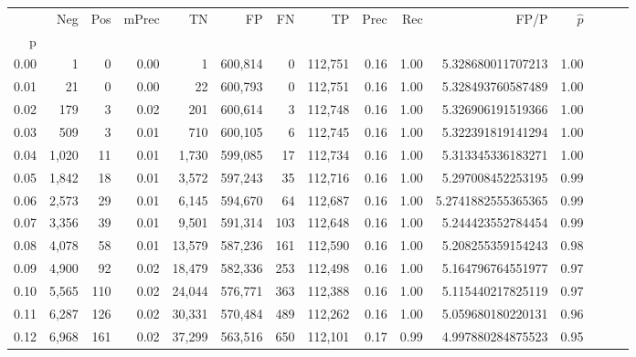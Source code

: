 \begin{tabular}{rrrrrrrrrrrrrrr}
\toprule
{} &     Neg &    Pos & mPrec &       TN &       FP &       FN &       TP &  Prec &   Rec &                    FP/P & $\hat{p}$ \\
p    &         &        &       &          &          &          &          &       &       &                         &           \\
\midrule
0.00 &       1 &      0 &  0.00 &        1 &  600,814 &        0 &  112,751 &  0.16 &  1.00 &       5.328680011707213 &      1.00 \\
0.01 &      21 &      0 &  0.00 &       22 &  600,793 &        0 &  112,751 &  0.16 &  1.00 &       5.328493760587489 &      1.00 \\
0.02 &     179 &      3 &  0.02 &      201 &  600,614 &        3 &  112,748 &  0.16 &  1.00 &       5.326906191519366 &      1.00 \\
0.03 &     509 &      3 &  0.01 &      710 &  600,105 &        6 &  112,745 &  0.16 &  1.00 &       5.322391819141294 &      1.00 \\
0.04 &   1,020 &     11 &  0.01 &    1,730 &  599,085 &       17 &  112,734 &  0.16 &  1.00 &       5.313345336183271 &      1.00 \\
0.05 &   1,842 &     18 &  0.01 &    3,572 &  597,243 &       35 &  112,716 &  0.16 &  1.00 &       5.297008452253195 &      0.99 \\
0.06 &   2,573 &     29 &  0.01 &    6,145 &  594,670 &       64 &  112,687 &  0.16 &  1.00 &      5.2741882555365365 &      0.99 \\
0.07 &   3,356 &     39 &  0.01 &    9,501 &  591,314 &      103 &  112,648 &  0.16 &  1.00 &       5.244423552784454 &      0.99 \\
0.08 &   4,078 &     58 &  0.01 &   13,579 &  587,236 &      161 &  112,590 &  0.16 &  1.00 &       5.208255359154243 &      0.98 \\
0.09 &   4,900 &     92 &  0.02 &   18,479 &  582,336 &      253 &  112,498 &  0.16 &  1.00 &       5.164796764551977 &      0.97 \\
0.10 &   5,565 &    110 &  0.02 &   24,044 &  576,771 &      363 &  112,388 &  0.16 &  1.00 &       5.115440217825119 &      0.97 \\
0.11 &   6,287 &    126 &  0.02 &   30,331 &  570,484 &      489 &  112,262 &  0.16 &  1.00 &       5.059680180220131 &      0.96 \\
0.12 &   6,968 &    161 &  0.02 &   37,299 &  563,516 &      650 &  112,101 &  0.17 &  0.99 &       4.997880284875523 &      0.95 \\

\end{tabular}

